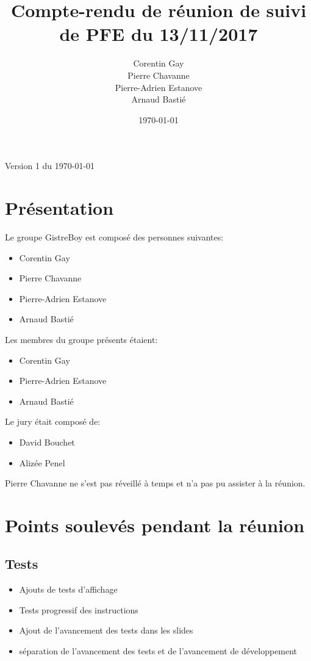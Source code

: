 \documentclass{article}
\author{Corentin Gay\\Pierre Chavanne\\Pierre-Adrien Estanove\\Arnaud
Basti\'e}
\date{\today}
\title{Compte-rendu de r\'eunion de suivi de PFE du 13/11/2017}
\begin{document}
\maketitle

Version 1 du \today
\section{Pr\'esentation}
Le groupe GistreBoy est compos\'e des personnes suivantes:
\begin{itemize}
	\item Corentin Gay
	\item Pierre Chavanne
	\item Pierre-Adrien Estanove
	\item Arnaud Basti\'e
\end{itemize}


Les membres du groupe pr\'esents \'etaient:
\begin{itemize}
	\item Corentin Gay
	\item Pierre-Adrien Estanove
	\item Arnaud Basti\'e
\end{itemize}


Le jury \'etait compos\'e de:
\begin{itemize}
	\item David Bouchet
	\item Aliz\'ee Penel
\end{itemize}
Pierre Chavanne ne s'est pas r\'eveill\'e \`a temps et n'a pas pu assister
\`a la r\'eunion.\\
\section{Points soulev\'es pendant la r\'eunion}

\subsection{Tests}
\begin{itemize}
	\item Ajouts de tests d'affichage
	\item Tests progressif des instructions
	\item Ajout de l'avancement des tests dans les slides
	\item s\'eparation de l'avancement des tests et de l'avancement de d\'eveloppement
\end{itemize}
\end{document}
